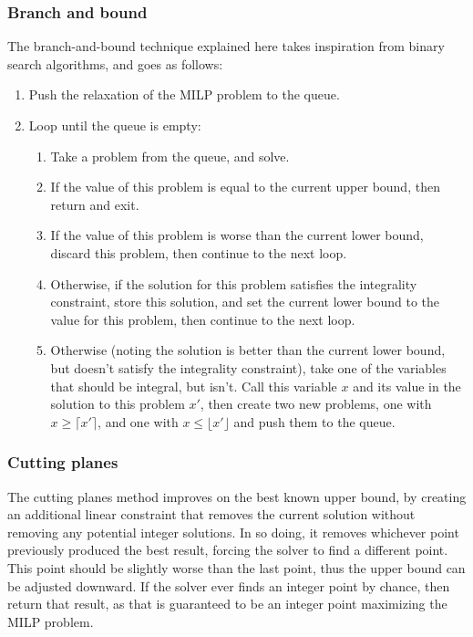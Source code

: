 \documentclass[10pt]{article}
\begin{document}
\subsubsection{Branch and bound}
The branch-and-bound technique explained here takes inspiration from binary search algorithms, and goes as follows\cite{land-doig-bnb}:
\begin{enumerate}
	\item Push the relaxation of the MILP problem to the queue.
	\item Loop until the queue is empty:\begin{enumerate}
		\item Take a problem from the queue, and solve. 
		\item If the value of this problem is equal to the current upper bound, then return and exit.
		\item If the value of this problem is worse than the current lower bound, discard this problem, then continue to the next loop.
		\item Otherwise, if the solution for this problem satisfies the integrality constraint, store this solution, and set the current lower bound to the value for this problem, then continue to the next loop.
		\item Otherwise (noting the solution is better than the current lower bound, but doesn't satisfy the integrality constraint), take one of the variables that should be integral, but isn't. Call this variable $x$ and its value in the solution to this problem $x'$, then create two new problems, one with $x\geq \lceil x'\rceil$, and one with $x\leq \lfloor x'\rfloor$ and push them to the queue.
	\end{enumerate}
\end{enumerate}
\subsubsection{Cutting planes}
The cutting planes method improves on the best known upper bound, by creating an additional linear constraint that removes the current solution without removing any potential integer solutions. In so doing, it removes whichever point previously produced the best result, forcing the solver to find a different point. This point should be slightly worse than the last point, thus the upper bound can be adjusted downward. If the solver ever finds an integer point by chance, then return that result, as that is guaranteed to be an integer point maximizing the MILP problem.
\end{document}
